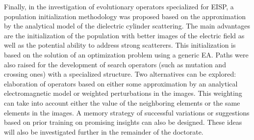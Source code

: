 		Finally, in the investigation of evolutionary operators specialized for EISP, a population initialization methodology was proposed based on the approximation by the analytical model of the dielectric cylinder scattering. The main advantages are the initialization of the population with better images of the electric field as well as the potential ability to address strong scatterers. This initialization is based on the solution of an optimization problem using a generic EA. Paths were also raised for the development of search operators (such as mutation and crossing ones) with a specialized structure. Two alternatives can be explored: elaboration of operators based on either some approximation by an analytical electromagnetic model or weighted perturbations in the images. This weighting can take into account either the value of the neighboring elements or the same elements in the images. A memory strategy of successful variations or suggestions based on prior training on promising insights can also be designed. These ideas will also be investigated further in the remainder of the doctorate.

				
				
